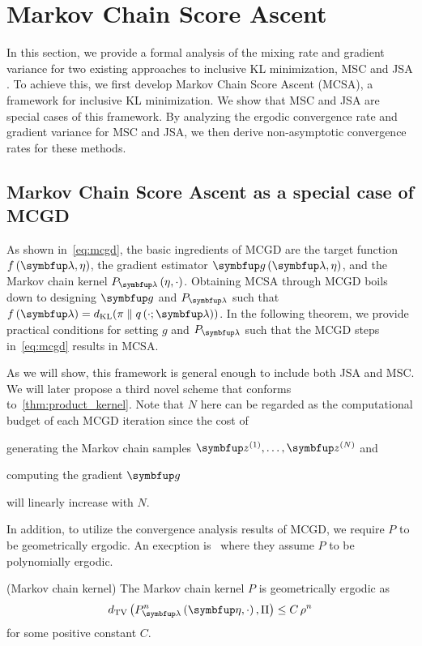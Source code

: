 
\section{Markov Chain Score Ascent}

In this section, we provide a formal analysis of the mixing rate and gradient variance for two existing approaches to inclusive KL minimization, MSC  and JSA . To achieve this, we first develop Markov Chain Score Ascent (MCSA), a framework for inclusive KL minimization. We show that MSC and JSA are special cases of this framework. By analyzing the ergodic convergence rate and gradient variance for MSC and JSA, we then derive non-asymptotic convergence rates for these methods.

\subsection{Markov Chain Score Ascent as a special case of MCGD}\label{section:convergence}

\vspace{-0.05in}
As shown in~\cref{eq:mcgd}, the basic ingredients of MCGD are the target function \(f\left(\vlambda, \eta\right)\), the gradient estimator \(\vg\left(\vlambda, \eta\right)\), and the Markov chain kernel \(P_{\vlambda}\left(\eta, \cdot\right)\).
Obtaining MCSA through MCGD boils down to designing \(\vg\) and \(P_{\vlambda}\) such that \(f\left(\vlambda\right) = \DKL{\pi}{q\left(\cdot; \vlambda\right)} \).
In the following theorem, we provide practical conditions for setting \(g\) and \(P_{\vlambda}\) such that the MCGD steps in~\cref{eq:mcgd} results in MCSA.



As we will show, this framework is general enough to include both JSA and MSC.
We will later propose a third novel scheme that conforms to~\cref{thm:product_kernel}.
Note that \(N\) here can be regarded as the computational budget of each MCGD iteration since the cost of
\begin{enumerate*}[label=\textbf{(\roman*)}]
  \item generating the Markov chain samples \(\vz^{(1)}, \ldots, \vz^{(N)}\) and
  \item computing the gradient \(\vg\)
\end{enumerate*}
will linearly increase with \(N\).

In addition, to utilize the convergence analysis results of MCGD, we require \(P\) to be geometrically ergodic.
An execption is~\citet{debavelaere_convergence_2021} where they assume \(P\) to be polynomially ergodic.
\begin{assumption}{(Markov chain kernel)}\label{thm:kernel_conditions}
\vspace{-0.05in}
  The Markov chain kernel \(P\) is geometrically ergodic as
  {%
  \[
  \DTV{P_{\vlambda}^{n}\left(\veta, \cdot\right)}{ \Pi } \leq C \, \rho^{n}
  \]
  }
  for some positive constant \(C\).
\end{assumption}
\vspace{-0.05in}

